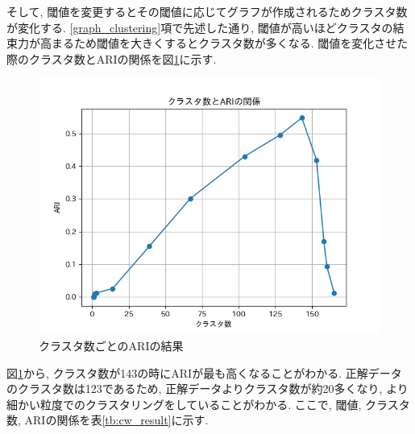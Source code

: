 そして, 閾値を変更するとその閾値に応じてグラフが作成されるためクラスタ数が変化する. \ref{graph_clustering}項で先述した通り, 閾値が高いほどクラスタの結束力が高まるため閾値を大きくするとクラスタ数が多くなる. 閾値を変化させた際のクラスタ数とARIの関係を図\ref{fig:cw_cluster_graph}に示す.

\begin{figure}[H]
  \centering
  \includegraphics[scale=0.8]
    {contents/images/cw_cluster_graph.png}
  \caption{クラスタ数ごとのARIの結果\label{fig:cw_cluster_graph}}
\end{figure}

図\ref{fig:cw_cluster_graph}から, クラスタ数が143の時にARIが最も高くなることがわかる. 正解データのクラスタ数は123であるため, 正解データよりクラスタ数が約20多くなり, より細かい粒度でのクラスタリングをしていることがわかる.  
ここで, 閾値, クラスタ数, ARIの関係を表\ref{tb:cw_result}に示す. 

